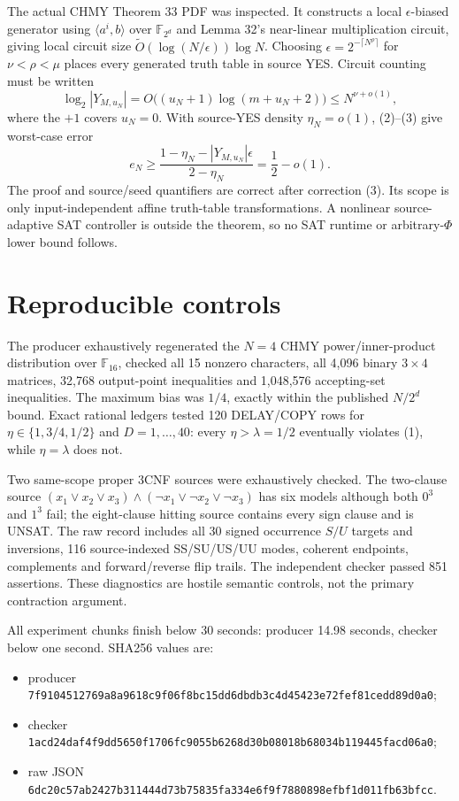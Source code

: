 \documentclass[11pt]{article}
\begin{document}
The actual CHMY Theorem 33 PDF was inspected.  It constructs a local
$\epsilon$-biased generator using $\langle a^i,b\rangle$ over
$\mathbb F_{2^d}$ and Lemma 32's near-linear multiplication circuit, giving
local circuit size $\widetilde O(\log(N/\epsilon))\log N$.  Choosing
$\epsilon=2^{-\lceil N^\rho\rceil}$ for $\nu<\rho<\mu$ places every generated
truth table in source YES.  Circuit counting must be written
\[
 \log_2|Y_{M,u_N}|=O\big((u_N+1)\log(m+u_N+2)\big)
                       \le N^{\nu+o(1)},                            \tag{3}
\]
where the $+1$ covers $u_N=0$.  With source-YES density $\eta_N=o(1)$,
(2)--(3) give worst-case error
\[
 e_N\ge\frac{1-\eta_N-|Y_{M,u_N}|\epsilon}{2-\eta_N}
       =\frac12-o(1).
\]
The proof and source/seed quantifiers are correct after correction (3).  Its
scope is only input-independent affine truth-table transformations.  A nonlinear
source-adaptive SAT controller is outside the theorem, so no SAT runtime or
arbitrary-$\Phi$ lower bound follows.

\section{Reproducible controls}
The producer exhaustively regenerated the $N=4$ CHMY power/inner-product
distribution over $\mathbb F_{16}$, checked all 15 nonzero characters, all 4,096
binary $3\times4$ matrices, 32,768 output-point inequalities and 1,048,576
accepting-set inequalities.  The maximum bias was $1/4$, exactly within the
published $N/2^d$ bound.  Exact rational ledgers tested 120 DELAY/COPY rows for
$\eta\in\{1,3/4,1/2\}$ and $D=1,\ldots,40$: every $\eta>\lambda=1/2$
eventually violates (1), while $\eta=\lambda$ does not.

Two same-scope proper 3CNF sources were exhaustively checked.  The two-clause
source $(x_1\vee x_2\vee x_3)\wedge(\neg x_1\vee\neg x_2\vee\neg x_3)$
has six models although both $0^3$ and $1^3$ fail; the eight-clause hitting
source contains every sign clause and is UNSAT.  The raw record includes all 30
signed occurrence $S/U$ targets and inversions, 116 source-indexed
SS/SU/US/UU modes, coherent endpoints, complements and forward/reverse flip
trails.  The independent checker passed 851 assertions.  These diagnostics are
hostile semantic controls, not the primary contraction argument.

All experiment chunks finish below 30 seconds: producer 14.98 seconds, checker
below one second.  SHA256 values are:
\begin{itemize}
\item producer \texttt{7f9104512769a8a9618c9f06f8bc15dd6dbdb3c4d45423e72fef81cedd89d0a0};
\item checker \texttt{1acd24daf4f9dd5650f1706fc9055b6268d30b08018b68034b119445facd06a0};
\item raw JSON \texttt{6dc20c57ab2427b311444d73b75835fa334e6f9f7880898efbf1d011fb63bfcc}.
\end{itemize}
\end{document}
